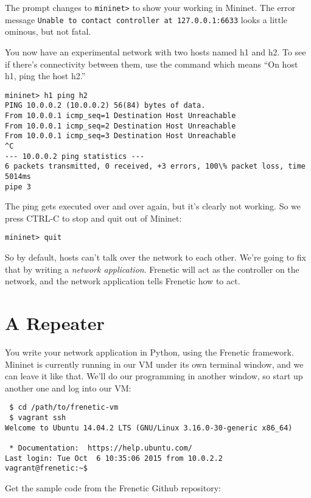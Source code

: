The prompt changes to {\tt mininet>} to show your working in Mininet.  
The error message {\tt Unable to contact controller at 127.0.0.1:6633} looks a little ominous, but not fatal.  

You now have an experimental network with two hosts named h1 and h2.  
To see if there's connectivity between them, use the command  which means ``On host h1, ping the host h2.''

\begin{verbatim}
mininet> h1 ping h2
PING 10.0.0.2 (10.0.0.2) 56(84) bytes of data.
From 10.0.0.1 icmp_seq=1 Destination Host Unreachable
From 10.0.0.1 icmp_seq=2 Destination Host Unreachable
From 10.0.0.1 icmp_seq=3 Destination Host Unreachable
^C
--- 10.0.0.2 ping statistics ---
6 packets transmitted, 0 received, +3 errors, 100\% packet loss, time 5014ms
pipe 3
\end{verbatim}

The ping gets executed over and over again, but it's clearly not working.  So we press CTRL-C to stop and 
quit out of Mininet:

\begin{verbatim}
mininet> quit
\end{verbatim}

So by default, hosts can't talk over the network to each other.  We're going to fix that by writing a {\it network
application}.    Frenetic will act as the controller on the network, and the network application tells Frenetic how to act.

\section{A Repeater}

You write your network application in Python, using the Frenetic framework.  Mininet is currently running in our VM under its own terminal window, and we can leave it like that.   
We'll do our programming in another window, so start up another one and log into our VM:

\begin{verbatim}
 $ cd /path/to/frenetic-vm
 $ vagrant ssh
Welcome to Ubuntu 14.04.2 LTS (GNU/Linux 3.16.0-30-generic x86_64)

 * Documentation:  https://help.ubuntu.com/
Last login: Tue Oct  6 10:35:06 2015 from 10.0.2.2
vagrant@frenetic:~$ 
\end{verbatim}

Get the sample code from the Frenetic Github repository:

